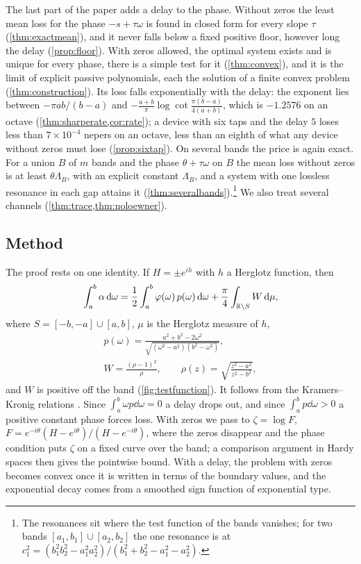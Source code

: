 The last part of the paper adds a delay to the phase. Without zeros the least
mean loss for the phase $-s+\tau\omega$ is found in closed form for every
slope $\tau$ (\cref{thm:exactmean}), and it never falls below a fixed positive
floor, however long the delay (\cref{prop:floor}). With zeros allowed, the
optimal system exists and is unique for every phase, there is a simple
test for it (\cref{thm:convex}), and it is the limit of explicit passive
polynomials, each the solution of a finite convex problem
(\cref{thm:construction}). Its loss falls exponentially with the delay: the
exponent lies between $-\pi ab/(b-a)$ and
$-\frac{a+b}\pi\log\cot\frac{\pi(b-a)}{4(a+b)}$, which is $-1.2576$ on an
octave (\cref{thm:sharperate,cor:rate}); a device with six taps and the
delay $5$ loses less than $7\times10^{-4}$ nepers on an octave, less than an eighth of
what any device without zeros must lose (\cref{prop:sixtap}).
On several bands the price is again exact. For a union $B$ of $m$ bands and
the phase $\theta+\tau\omega$ on $B$ the mean loss without zeros is at least
$\theta\Lambda_B$, with an explicit constant $\Lambda_B$, and a system with
one lossless resonance in each gap attains it
(\cref{thm:severalbands}).\footnote{The resonances sit where the test
function of the bands vanishes; for two bands $[a_1,b_1]\cup[a_2,b_2]$ the
one resonance is at $c_1^2=(b_1^2b_2^2-a_1^2a_2^2)/(b_1^2+b_2^2-a_1^2-a_2^2)$.}
We also treat several channels (\cref{thm:trace,thm:noloewner}).

\subsection{Method}

The proof rests on one identity. If $H=\pm e^{ih}$ with $h$ a Herglotz
function, then
\begin{equation}\label{eq:intro-sum}
\int_a^b\alpha\,\mathrm d\omega
=\frac12\int_a^b\varphi(\omega)\,p(\omega)\,\mathrm d\omega
+\frac\pi4\int_{\mathbb R\setminus S}W\,\mathrm d\mu ,
\end{equation}
where $S=[-b,-a]\cup[a,b]$, $\mu$ is the Herglotz measure of $h$,
\begin{gather*}
p(\omega)=\frac{a^2+b^2-2\omega^2}{\sqrt{(\omega^2-a^2)(b^2-\omega^2)}},\\
W=\frac{(\rho-1)^2}{\rho},\qquad
\rho(z)=\sqrt{\frac{z^2-a^2}{z^2-b^2}} ,
\end{gather*}
and $W$ is positive off the band (\cref{fig:testfunction}). It follows from
the Kramers--Kronig relations \cite{kronig,kramers,toll}. Since
$\int_a^b\omega p\dd\omega=0$ a delay drops out, and since $\int_a^bp\dd\omega>0$
a positive constant phase forces loss. With zeros we pass to $\zeta=\log F$,
$F=e^{-i\theta}(H-e^{i\theta})/(H-e^{-i\theta})$, where the zeros disappear and
the phase condition puts $\zeta$ on a fixed curve over the band; a comparison
argument in Hardy spaces then gives the pointwise bound. With a delay, the
problem with zeros becomes convex once it is written in terms of the
boundary values, and the exponential decay comes from a smoothed sign
function of exponential type.

